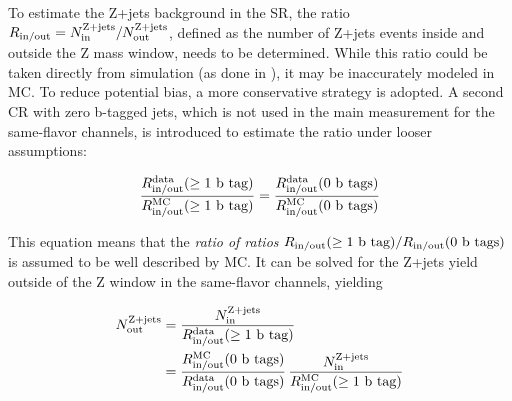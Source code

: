 To estimate the Z+jets background in the SR, the ratio $R_{\mathrm{in/out}} = N_{\mathrm{in}}^{\mathrm{Z+jets}} / N_{\mathrm{out}}^{\mathrm{Z+jets}}$, defined as the number of Z+jets events inside and outside the Z mass window, needs to be determined. While this ratio could be taken directly from simulation (as done in ), it may be inaccurately modeled in MC. To reduce potential bias, a more conservative strategy is adopted. A second CR with zero b-tagged jets, which is not used in the main measurement for the same-flavor channels, is introduced to estimate the ratio under looser assumptions:


\begin{equation}
    \frac{  R_{\mathrm{in/out}}^{\text{data}} ( \geq \text{1 b tag} ) } { R_{\mathrm{in/out}}^{\text{MC}} ( \geq \text{1 b tag} ) } = \frac{  R_{\mathrm{in/out}}^{\text{data}} ( \text{0 b tags} ) } { R_{\mathrm{in/out}}^{\text{MC}} ( \text{0 b tags} ) }
\end{equation}

This equation means that the \textit{ratio of ratios} $R_{\mathrm{in/out}}( \geq \text{1 b tag} ) / R_{\mathrm{in/out}}( \text{0 b tags} )$ is assumed to be well described by MC.
It can be solved for the Z+jets yield outside of the Z window in the same-flavor channels, yielding

\begin{equation}
\begin{split}
    N_{\mathrm{out}}^{\mathrm{Z+jets}} &= \frac {N_{\mathrm{in}}^{\mathrm{Z+jets}}} {R_{\mathrm{in/out}}^{\text{data}} ( \geq \text{1 b tag} )}  \\
    &= \frac{  R_{\mathrm{in/out}}^{\text{MC}} ( \text{0 b tags} ) } { R_{\mathrm{in/out}}^{\text{data}} ( \text{0 b tags} ) } \, \frac {N_{\mathrm{in}}^{\mathrm{Z+jets}}} {R_{\mathrm{in/out}}^{\text{MC}} ( \geq \text{1 b tag} )}
\end{split}
\end{equation}


